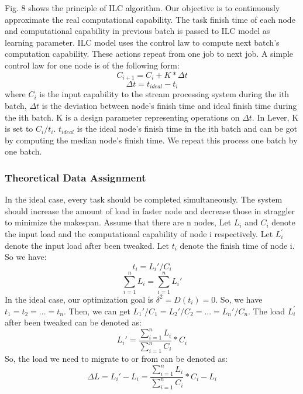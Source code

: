 \documentclass[10pt,conference,compsocconf,letterpaper]{IEEEtran}
\begin{document}
  Fig. 8 shows the principle of ILC algorithm. Our objective is to continuously approximate the real computational capability. The task finish time of each node and computational capability in previous batch is passed to ILC model as learning parameter. ILC model uses the control law to compute next batch's computation capability. These actions repeat from one job to next job. A simple control law for one node is of the following form:
  \begin{equation}
  C_{i+1} = C_i + K*\Delta t
  \end{equation}
   \begin{equation}
  \Delta t = t_{ideal} - t_{i}
  \end{equation}
  where $C_i$ is the input capability to the stream processing system during the ith batch, $\Delta t$ is the deviation between node's finish time and ideal finish time during the ith batch. K is a design parameter representing operations on $\Delta t$. In Lever, K is set to $C_i/t_i$. $t_{ideal}$ is the ideal node's finish time in the ith batch and can be got by computing the median node's finish time. We repeat this process one batch by one batch.

\subsubsection{Theoretical Data Assignment}

  In the ideal case, every task should be completed simultaneously. The system should increase the amount of load in faster node and decrease those in straggler to minimize the makespan. Assume that there are n nodes, Let \emph{$L_i$} and \emph{$C_i$} denote the input load and the computational capability of node i respectively. Let \emph{$L_i^\prime$} denote the input load after been tweaked. Let $t_i$ denote the finish time of node i. So we have:
  \begin{equation}
  t_i = L_i\prime / C_i
  \end{equation}
  \begin{equation}
  \sum_{i=1}^n L_i = \sum_{i=1}^n L_i\prime
  \end{equation}
  In the ideal case, our optimization goal is $\delta^{2}=D(t_i)=0$. So, we have $t_1=t_2=...=t_n$. Then, we can get $L_1\prime/C_1=L_2\prime/C_2=...=L_n\prime/C_n$. The load \emph{$L_i^\prime$} after been tweaked can be denoted as:
  \begin{equation}
  L_i\prime =  \frac{\sum_{i=1}^n L_i}{\sum_{i=1}^n C_i}*C_i
  \end{equation}
  So, the load we need to migrate to or from can be denoted as:
  \begin{equation}
  \Delta L = L_i\prime - L_i = \frac{\sum_{i=1}^n L_i}{\sum_{i=1}^n C_i}*C_i - L_i
  \end{equation}
\end{document}

